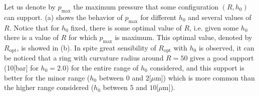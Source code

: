Let us denote by $p_\text{max}$ the maximum pressure that some configuration $(R,h_0)$ can support. (a) shows the behavior of $p_\text{max}$ for different $h_0$ and several values of $R$. Notice that for $h_0$ fixed, there is some optimal value of $R$, i.e. given some $h_0$ there is a value of $R$ for which $p_\text{max}$ is maximum. This optimal value, denoted by $R_\text{opt}$, is showed in (b). In spite great sensibility of $R_\text{opt}$ with $h_0$ is observed, it can be noticed that a ring with curvature radius around $R=50$ gives a good support (10[bar] for $h_0=2.0$) for the entire range of $h_0$ considered, and this support is better for the minor range ($h_0$ between $0$ and $2$[$\mu$m]) which is more common \cite{dhar2009} than the higher range considered ($h_0$ between $5$ and $10$[$\mu$m]).